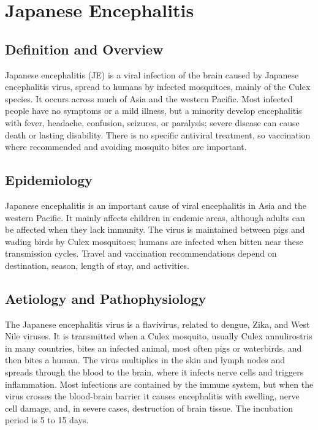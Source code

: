 \chapter{Japanese Encephalitis}

\section*{Definition and Overview}
Japanese encephalitis (JE) is a viral infection of the brain caused by Japanese encephalitis virus, spread to humans by infected mosquitoes, mainly of the Culex species. It occurs across much of Asia and the western Pacific. Most infected people have no symptoms or a mild illness, but a minority develop encephalitis with fever, headache, confusion, seizures, or paralysis; severe disease can cause death or lasting disability. There is no specific antiviral treatment, so vaccination where recommended and avoiding mosquito bites are important.

\section*{Epidemiology}
Japanese encephalitis is an important cause of viral encephalitis in Asia and the western Pacific. It mainly affects children in endemic areas, although adults can be affected when they lack immunity. The virus is maintained between pigs and wading birds by Culex mosquitoes; humans are infected when bitten near these transmission cycles. Travel and vaccination recommendations depend on destination, season, length of stay, and activities.

\section*{Aetiology and Pathophysiology}
The Japanese encephalitis virus is a flavivirus, related to dengue, Zika, and West Nile viruses. It is transmitted when a Culex mosquito, usually Culex annulirostris in many countries, bites an infected animal, most often pigs or waterbirds, and then bites a human. The virus multiplies in the skin and lymph nodes and spreads through the blood to the brain, where it infects nerve cells and triggers inflammation. Most infections are contained by the immune system, but when the virus crosses the blood-brain barrier it causes encephalitis with swelling, nerve cell damage, and, in severe cases, destruction of brain tissue. The incubation period is 5 to 15 days.

